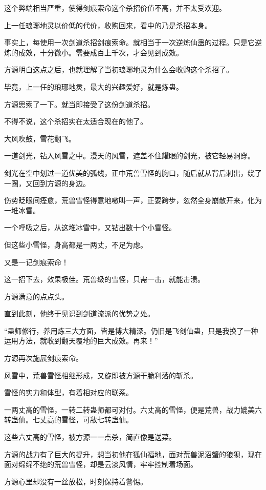 \begin{this_body}
这个弊端相当严重，使得剑痕索命这个杀招价值不高，并不太受欢迎。

上一任琅琊地灵以价低的代价，收购回来，看中的乃是杀招本身。

事实上，每使用一次剑道杀招剑痕索命。就相当于一次逆炼仙蛊的过程。只是它逆炼的成效，十分微小。需要成百上千次，才会见到成效。

方源明白这点之后，也就理解了当初琅琊地灵为什么会收购这个杀招了。

毕竟，上一任的琅琊地灵，最大的兴趣爱好，就是炼蛊。

方源思索了一下。就当即接受了这份剑道杀招。

不得不说，这个杀招实在太适合现在的他了。

大风吹鼓，雪花翻飞。

一道剑光，钻入风雪之中。漫天的风雪，遮盖不住耀眼的剑光，被它轻易洞穿。

剑光在空中划过一道优美的弧线，正中荒兽雪怪的胸口，随后就从背后刺出，绕了一圈，又回到方源的身边。

伤势眨眼间痊愈，荒兽雪怪得意地嗷叫一声，正要跨步，忽然全身崩散开来，化为一堆冰雪。

一个呼吸之后，从这堆冰雪中，又钻出数十个小雪怪。

但这些小雪怪，身高都是一两丈，不足为虑。

又是一记剑痕索命！

这一招下去，效果极佳。荒兽级的雪怪，只需一击，就能击溃。

方源满意的点点头。

直到此刻，他终于见识到剑道流派的优势之处。

“蛊师修行，养用炼三大方面，皆是博大精深。仍旧是飞剑仙蛊，只是我换了一种运用方法，就收到翻天覆地的巨大成效。再来！”

方源再次施展剑痕索命。

风雪中，荒兽雪怪相继形成，又旋即被方源干脆利落的斩杀。

雪怪的实力和体型，有着相对应的联系。

一两丈高的雪怪，一转二转蛊师都可对付。六丈高的雪怪，便是荒兽，战力媲美六转蛊仙。七丈高的雪怪，可敌七转蛊仙。

这些六丈高的雪怪，被方源一一点杀，简直像是送菜。

方源的战力有了巨大的提升，想当初他在狐仙福地，面对荒兽泥沼蟹的狼狈，现在面对绵绵不绝的荒兽雪怪，却是云淡风情，牢牢控制着场面。

方源心里却没有一丝放松，时刻保持着警惕。


\end{this_body}
